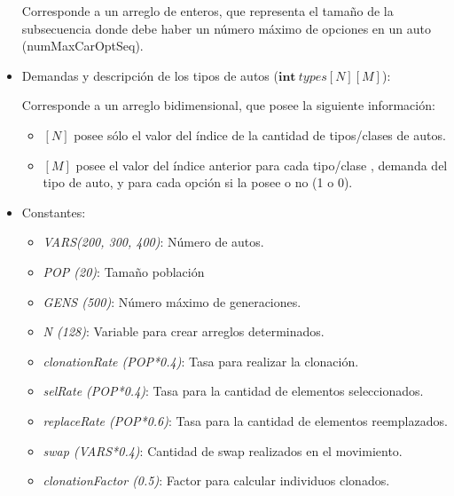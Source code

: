 \begin{itemize}
		Corresponde a un arreglo de enteros, que representa el tamaño de la subsecuencia donde debe haber un número máximo de opciones en un auto (numMaxCarOptSeq).

	\item Demandas y descripción de los tipos de autos ($\textbf{int}\ types[N][M]$):
	
	Corresponde a un arreglo bidimensional, que posee la siguiente información:
	\begin{itemize}
		\item $[N]$ posee sólo el valor del índice de la cantidad de tipos/clases de autos.
		\item $[M]$ posee el valor del índice anterior para cada tipo/clase , demanda del tipo de auto, y para cada opción si la posee o no (1 o 0).
	\end{itemize}
	\item Constantes:

		\begin{itemize}
			\item \emph{VARS(200, 300, 400)}: Número de autos.
			\item \emph{POP (20)}: Tamaño población
			\item \emph{GENS (500)}: Número máximo de generaciones.
			\item \emph{N (128)}: Variable para crear arreglos determinados.
			\item \emph{clonationRate (POP*0.4)}: Tasa para realizar la clonación.
			\item \emph{selRate (POP*0.4)}: Tasa para la cantidad de elementos seleccionados.
			\item \emph{replaceRate (POP*0.6)}: Tasa para la cantidad de elementos reemplazados.
			\item \emph{swap (VARS*0.4)}: Cantidad de swap realizados en el movimiento.
			\item \emph{clonationFactor (0.5)}: Factor para calcular individuos clonados.
		\end{itemize}

\end{itemize}
